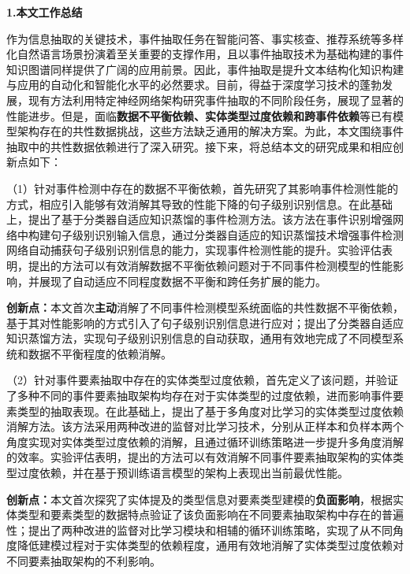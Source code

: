 

\begin{conclusion}

\textbf{1.本文工作总结}

作为信息抽取的关键技术，事件抽取任务在智能问答、事实核查、推荐系统等多样化自然语言场景扮演着至关重要的支撑作用，且以事件抽取技术为基础构建的事件知识图谱同样提供了广阔的应用前景。因此，事件抽取是提升文本结构化知识构建与应用的自动化和智能化水平的必然要求。目前，得益于深度学习技术的蓬勃发展，现有方法利用特定神经网络架构研究事件抽取的不同阶段任务，展现了显著的性能进步。但是，面临\textbf{数据不平衡依赖、实体类型过度依赖和跨事件依赖}等已有模型架构存在的共性数据挑战，这些方法缺乏通用的解决方案。为此，本文围绕事件抽取中的共性数据依赖进行了深入研究。接下来，将总结本文的研究成果和相应创新点如下：

（1）针对事件检测中存在的数据不平衡依赖，首先研究了其影响事件检测性能的方式，相应引入能够有效消解其导致的性能下降的句子级别识别信息。在此基础上，提出了基于分类器自适应知识蒸馏的事件检测方法。该方法在事件识别增强网络中构建句子级别识别输入信息，通过分类器自适应的知识蒸馏技术增强事件检测网络自动捕获句子级别识别信息的能力，实现事件检测性能的提升。实验评估表明，提出的方法可以有效消解数据不平衡依赖问题对于不同事件检测模型的性能影响，并展现了自动适应不同程度数据不平衡和跨任务扩展的能力。

\textbf{创新点：}本文首次\textbf{主动}消解了不同事件检测模型系统面临的共性数据不平衡依赖，基于其对性能影响的方式引入了句子级别识别信息进行应对；提出了分类器自适应知识蒸馏方法，实现句子级别识别信息的自动获取，通用有效地完成了不同模型系统和数据不平衡程度的依赖消解。

（2）针对事件要素抽取中存在的实体类型过度依赖，首先定义了该问题，并验证了多种不同的事件要素抽取架构均存在对于实体类型的过度依赖，进而影响事件要素类型的抽取表现。在此基础上，提出了基于多角度对比学习的实体类型过度依赖消解方法。该方法采用两种改进的监督对比学习技术，分别从正样本和负样本两个角度实现对实体类型过度依赖的消解，且通过循环训练策略进一步提升多角度消解的效率。实验评估表明，提出的方法可以有效消解不同事件要素抽取架构的实体类型过度依赖，并在基于预训练语言模型的架构上表现出当前最优性能。

\textbf{创新点：}本文首次探究了实体提及的类型信息对要素类型建模的\textbf{负面影响}，根据实体类型和要素类型的数据特点验证了该负面影响在不同要素抽取架构中存在的普遍性；提出了两种改进的监督对比学习模块和相辅的循环训练策略，实现了从不同角度降低建模过程对于实体类型的依赖程度，通用有效地消解了实体类型过度依赖对不同要素抽取架构的不利影响。


\end{conclusion}
